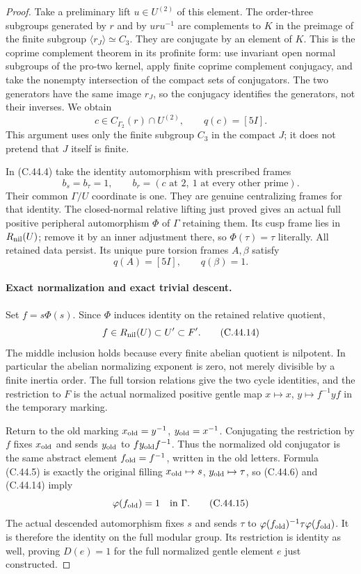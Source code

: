 \begin{proof}
Take a preliminary lift $u\in U^{(2)}$ of this element.
The order-three subgroups generated by $r$ and by $uru^{-1}$
are complements to $K$ in the preimage of the finite subgroup
$\langle r_J\rangle\simeq C_3$. They are conjugate by an
element of $K$. This is the coprime complement theorem in its
profinite form: use invariant open normal subgroups of the
pro-two kernel, apply finite coprime complement conjugacy, and
take the nonempty intersection of the compact sets of conjugators.
The two generators have the same image $r_J$, so the conjugacy
identifies the generators, not their inverses. We obtain
\[
 c\in C_{\Gamma_2}(r)\cap U^{(2)},\qquad q(c)=[5I].    \tag{C.44.11}
\]
This argument uses only the finite subgroup $C_3$ in the compact
$J$; it does not pretend that $J$ itself is finite.

In (C.44.4) take the identity automorphism with prescribed frames
\[
 b_s=b_\tau=1,\qquad
 b_r=(c\text{ at }2,\ 1\text{ at every other prime}).  \tag{C.44.12}
\]
Their common $\Gamma/U$ coordinate is one. They are genuine
centralizing frames for that identity. The closed-normal relative
lifting just proved gives an actual full positive peripheral
automorphism $\Phi$ of $\Gamma$ retaining them. Its cusp frame
lies in $R_{\rm nil}(U)$; remove it by an inner adjustment there,
so $\Phi(\tau)=\tau$ literally. All retained data persist.
Its unique pure torsion frames $A,\beta$ satisfy
\[
                     q(A)=[5I],\qquad q(\beta)=1.       \tag{C.44.13}
\]

\paragraph{Exact normalization and exact trivial descent.}
Set $f=s\Phi(s)$. Since $\Phi$ induces identity on the retained
relative quotient,
\[
        f\in R_{\rm nil}(U)\subset U'\subset F'.        \tag{C.44.14}
\]
The middle inclusion holds because every finite abelian quotient
is nilpotent. In particular the abelian normalizing exponent is
zero, not merely divisible by a finite inertia order. The full
torsion relations give the two cycle identities, and the
restriction to $F$ is the actual normalized positive gentle map
$x\mapsto x$, $y\mapsto f^{-1}yf$ in the temporary marking.

Return to the old marking
$x_{\rm old}=y^{-1}$, $y_{\rm old}=x^{-1}$.
Conjugating the restriction by $f$ fixes $x_{\rm old}$ and sends
$y_{\rm old}$ to $f y_{\rm old}f^{-1}$. Thus the normalized old
conjugator is the same abstract element $f_{\rm old}=f^{-1}$,
written in the old letters. Formula (C.44.5) is exactly the
original filling $x_{\rm old}\mapsto s$,
$y_{\rm old}\mapsto\tau$, so (C.44.6) and (C.44.14) imply
\[
                           \varphi(f_{\rm old})=1
                            \quad\hbox{in }\Gamma.     \tag{C.44.15}
\]
The actual descended automorphism fixes $s$ and sends $\tau$
to $\varphi(f_{\rm old})^{-1}\tau\varphi(f_{\rm old})$.
It is therefore the identity on the full modular group.
Its restriction is identity as well, proving $D(e)=1$ for the
full normalized gentle element $e$ just constructed.


\end{proof}
